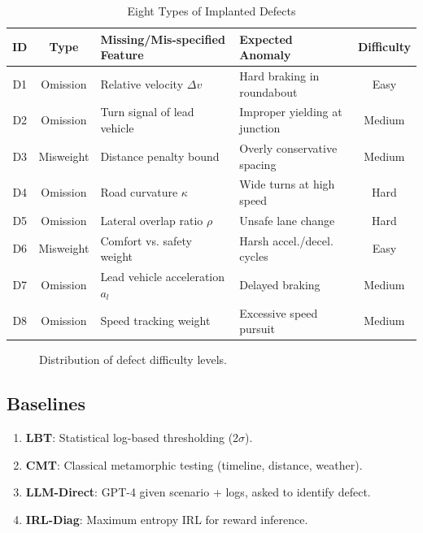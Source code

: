 \documentclass[conference]{IEEEtran}
\theoremstyle{plain}
\begin{document}
\begin{table}[h]
\centering
\caption{Eight Types of Implanted Defects}
\label{tab:defects}
\small
\begin{tabular}{ccp{2.8cm}p{2.5cm}c}
\toprule
\textbf{ID} & \textbf{Type} & \textbf{Missing/Mis-specified Feature} & \textbf{Expected Anomaly} & \textbf{Difficulty}\\\midrule
D1 & Omission & Relative velocity $\Delta v$ & Hard braking in roundabout & Easy\\
D2 & Omission & Turn signal of lead vehicle & Improper yielding at junction & Medium\\
D3 & Misweight & Distance penalty bound & Overly conservative spacing & Medium\\
D4 & Omission & Road curvature $\kappa$ & Wide turns at high speed & Hard\\
D5 & Omission & Lateral overlap ratio $\rho$ & Unsafe lane change & Hard\\
D6 & Misweight & Comfort vs. safety weight & Harsh accel./decel. cycles & Easy\\
D7 & Omission & Lead vehicle acceleration $a_l$ & Delayed braking & Medium\\
D8 & Omission & Speed tracking weight & Excessive speed pursuit & Medium\\
\bottomrule
\end{tabular}
\end{table}

\begin{figure}[h]
\centering
{}
\caption{Distribution of defect difficulty levels.}
\label{fig:defect_dist}
\end{figure}

\subsection{Baselines}
\begin{enumerate}[nosep]
    \item \textbf{LBT}: Statistical log-based thresholding (2$\sigma$).
    \item \textbf{CMT}: Classical metamorphic testing (timeline, distance, weather).
    \item \textbf{LLM-Direct}: GPT-4 given scenario + logs, asked to identify defect.
    \item \textbf{IRL-Diag}: Maximum entropy IRL for reward inference.
\end{enumerate}
\end{document}
